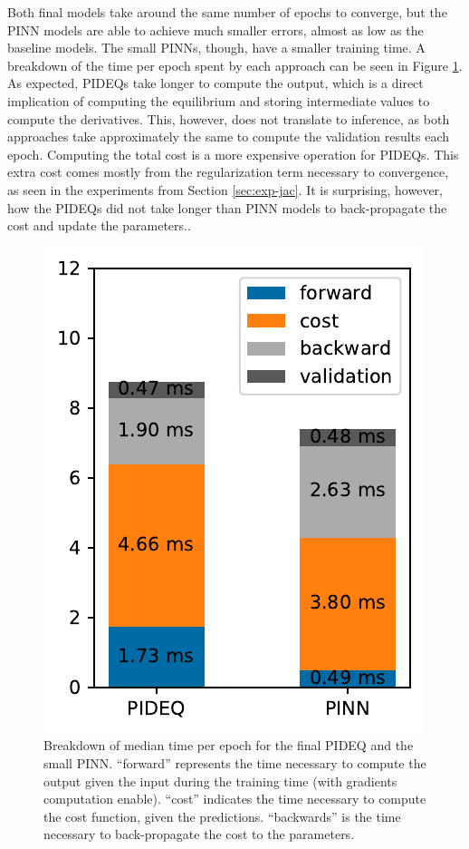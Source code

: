 Both final models take around the same number of epochs to converge, but the \gls{PINN} models are able to achieve much smaller errors, almost as low as the baseline models.
The small \glspl{PINN}, though, have a smaller training time.
A breakdown of the time per epoch spent by each approach can be seen in Figure \ref{fig:final-times}.
As expected, \glspl{PIDEQ} take longer to compute the output, which is a direct implication of computing the equilibrium and storing intermediate values to compute the derivatives.
This, however, does not translate to inference, as both approaches take approximately the same to compute the validation results each epoch.
Computing the total cost is a more expensive operation for \glspl{PIDEQ}.
This extra cost comes mostly from the regularization term necessary to convergence, as seen in the experiments from Section \ref{sec:exp-jac}.
It is surprising, however, how the \glspl{PIDEQ} did not take longer than \gls{PINN} models to back-propagate the cost and update the parameters..

\begin{figure}[h]
    \centering
    \includegraphics{images/final_times.pdf}
    \caption{Breakdown of median time per epoch for the final \gls{PIDEQ} and the small \gls{PINN}. ``forward'' represents the time necessary to compute the output given the input during the training time (with gradients computation enable). ``cost'' indicates the time necessary to compute the cost function, given the predictions. ``backwards'' is the time necessary to back-propagate the cost to the parameters.}
    \label{fig:final-times}
\end{figure}

